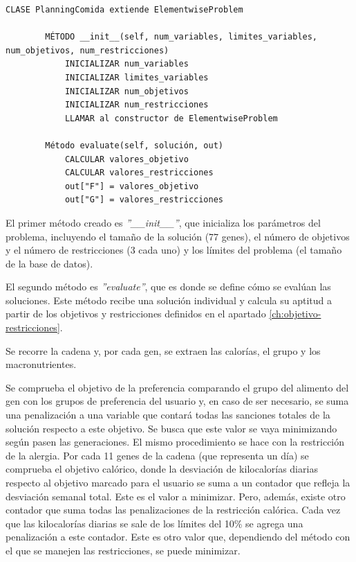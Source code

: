 \begin{lstlisting}[basicstyle=\ttfamily, caption=Clase para la evaluación.,label={lst:planning}]
    CLASE PlanningComida extiende ElementwiseProblem
    
        MÉTODO __init__(self, num_variables, limites_variables, num_objetivos, num_restricciones)
            INICIALIZAR num_variables
            INICIALIZAR limites_variables
            INICIALIZAR num_objetivos
            INICIALIZAR num_restricciones
            LLAMAR al constructor de ElementwiseProblem
    
        Método evaluate(self, solución, out)
            CALCULAR valores_objetivo
            CALCULAR valores_restricciones
            out["F"] = valores_objetivo
            out["G"] = valores_restricciones
\end{lstlisting}

El primer método creado es \textit{''\_\_init\_\_''}, que inicializa los parámetros del problema, incluyendo el tamaño de la solución (77 genes), el número de objetivos y el número de restricciones (3 cada uno) y los límites del problema (el tamaño de la base de datos).

El segundo método es \textit{''evaluate''}, que es donde se define cómo se evalúan las soluciones. Este método recibe una solución individual y calcula su aptitud a partir de los objetivos y restricciones definidos en el apartado \ref{ch:objetivo-restricciones}.

Se recorre la cadena y, por cada gen, se extraen las calorías, el grupo y los macronutrientes.

Se comprueba el objetivo de la preferencia comparando el grupo del alimento del gen con los grupos de preferencia del usuario y, en caso de ser necesario, se suma una penalización a una variable que contará todas las sanciones totales de la solución respecto a este objetivo. Se busca que este valor se vaya minimizando según pasen las generaciones. El mismo procedimiento se hace con la restricción de la alergia.
\newpage
Por cada 11 genes de la cadena (que representa un día) se comprueba el objetivo calórico, donde la desviación de kilocalorías diarias respecto al objetivo marcado para el usuario se suma a un contador que refleja la desviación semanal total. Este es el valor a minimizar. Pero, además, existe otro contador que suma todas las penalizaciones de la restricción calórica. Cada vez que las kilocalorías diarias se sale de los límites del 10\% se agrega una penalización a este contador. Este es otro valor que, dependiendo del método con el que se manejen las restricciones, se puede minimizar.

